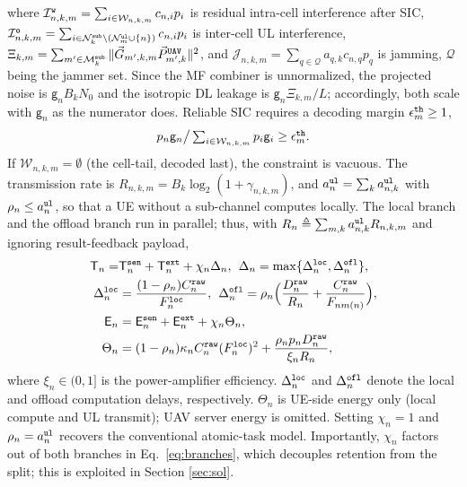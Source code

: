 \documentclass[journal]{IEEEtran}
\begin{document}
where $\mathcal{I}_{n,k,m}^{\tt w}=\sum_{i\in\mathcal{W}_{n,k,m}}c_{n,i} p_i$ is residual intra-cell interference after SIC,
$\mathcal{I}_{n,k,m}^{\tt o}=\sum_{i\in\mathcal{N}_k^{\tt sub}\setminus(\mathcal{N}_m^{\tt ul}\cup\{n\})}c_{n,i} p_i$ is inter-cell UL interference,
$\Xi_{k,m}=\sum_{m'\in\mathcal{M}_k^{\tt sub}}\Vert\vec{G}_{m',k,m}\vec{P}_{m',k}^{\tt UAV}\Vert^2$, and
$\mathcal{J}_{n,k,m}=\sum_{q\in\mathcal{Q}}a_{q,k}c_{n,q} p_q$ is jamming, $\mathcal{Q}$ being the jammer set. 
Since the MF combiner is unnormalized, the projected noise is $\mathsf{g}_nB_kN_0$ and the isotropic DL leakage is $\mathsf{g}_n\Xi_{k,m}/L$; accordingly, both scale with $\mathsf{g}_n$ as the numerator does.
Reliable SIC requires a decoding margin $\epsilon_m^{\tt th}\ge1$,
\begin{equation}
\textstyle p_n\mathsf{g}_n\big/\sum_{i\in\mathcal{W}_{n,k,m}}p_i\mathsf{g}_i\ge\epsilon_m^{\tt th}.
\label{eq:sic}
\end{equation}
{If $\mathcal{W}_{n,k,m}=\emptyset$ (the cell-tail, decoded last), the constraint is vacuous.}
The transmission rate is $R_{n,k,m}=B_k\log_2(1+\gamma_{n,k,m})$, and $a_n^{\tt ul}=\sum_k a_{n,k}^{\tt ul}$ with $\rho_n\le a_n^{\tt ul}$, so that a UE without a sub-channel computes locally. The local branch and the offload branch run in parallel; thus, with $R_n\triangleq\sum_{m,k}a_{n,k}^{\tt ul}R_{n,k,m}$ and ignoring result-feedback payload,
\begin{align}
\mathsf{T}_n=&\mathsf{T}_n^{\tt sen}+\mathsf{T}_n^{\tt ext}+\chi_n\Delta_n,
\hspace{1ex}
\Delta_n=\max\{\Delta_n^{\tt loc},\Delta_n^{\tt ofl}\},
\label{eq:Tn}\\
\Delta_n^{\tt loc}&=\frac{(1-\rho_n)C_n^{\tt raw}}{F_n^{\tt loc}}, \hspace{1ex}
\Delta_n^{\tt ofl}=\rho_n\Big(\frac{D_n^{\tt raw}}{R_n}+\frac{C_n^{\tt raw}}{F_{n m(n)}}\Big),
\label{eq:branches}\\
\mathsf{E}_n&=\mathsf{E}_n^{\tt sen}+\mathsf{E}_n^{\tt ext}+\chi_n\Theta_n,
\label{eq:En}\\
\Theta_n&=(1-\rho_n)\kappa_n C_n^{\tt raw}(F_n^{\tt loc})^2+\frac{\rho_n p_n D_n^{\tt raw}}{\xi_n R_n},
\label{eq:Theta}
\end{align}
where $\xi_n\in(0,1]$ is the power-amplifier efficiency.
{$\Delta_n^{\tt loc}$ and $\Delta_n^{\tt ofl}$ denote the local and offload computation delays, respectively.}
$\Theta_n$ is UE-side energy only (local compute and UL transmit); UAV server energy is omitted.
Setting $\chi_n=1$ and $\rho_n=a_n^{\tt ul}$ recovers the conventional atomic-task model. 
Importantly, $\chi_n$ factors out of both branches in Eq.~\eqref{eq:branches}, which decouples retention from the split; this is exploited in Section \ref{sec:sol}.
\end{document}
